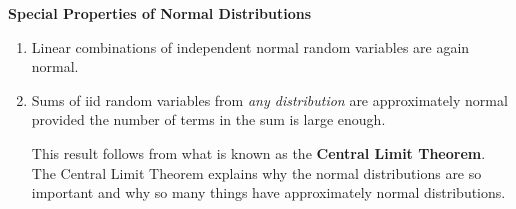 \documentclass[twoside]{book}\usepackage[]{graphicx}\usepackage[]{xcolor}
\def\term#1{\textbf{#1}}
\newlength{\tempfmlength}
\newenvironment{fmpage}[1]
     {
	 \medskip
	 \setlength{\tempfmlength}{#1}
	 \begin{lrbox}{\fmbox}
	   \begin{minipage}{#1}
		 \vspace*{.02\tempfmlength}
		 \hfill
	   \begin{minipage}{.95 \tempfmlength}}
		 {\end{minipage}\hfill
		 \vspace*{.015\tempfmlength}
		 \end{minipage}\end{lrbox}\fbox{\usebox{\fmbox}}
	 \medskip
	 }
\newenvironment{boxedText}[1][.98\textwidth]%
{%
\begin{center}
\begin{fmpage}{#1}
}%
{%
\end{fmpage}
\end{center}
}
\begin{document}
\begin{boxedText}

	\centerline{\textbf{Special Properties of Normal Distributions}}

\begin{enumerate}
	\item
	Linear combinations of independent normal random variables are again normal.

	\medskip

\item
	Sums of iid random variables from \emph{any distribution} are approximately
	normal provided the number of terms in the sum is large enough.

	This result follows from what is known as the \term{Central Limit Theorem}.
	The Central Limit Theorem explains why the normal distributions
	are so important and why so many things have approximately normal distributions.
\end{enumerate}
\end{boxedText}
\end{document}

